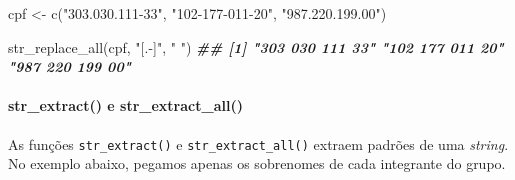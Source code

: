 \documentclass[
]{book}
\newenvironment{Shaded}{\begin{snugshade}}{\end{snugshade}}
\newcommand{\DocumentationTok}[1]{\textcolor[rgb]{0.56,0.35,0.01}{\textbf{\textit{#1}}}}
\newcommand{\FunctionTok}[1]{\textcolor[rgb]{0.00,0.00,0.00}{#1}}
\newcommand{\NormalTok}[1]{#1}
\newcommand{\OtherTok}[1]{\textcolor[rgb]{0.56,0.35,0.01}{#1}}
\newcommand{\StringTok}[1]{\textcolor[rgb]{0.31,0.60,0.02}{#1}}
\begin{document}
\begin{Shaded}
\begin{Highlighting}[]
\NormalTok{cpf }\OtherTok{\textless{}{-}} \FunctionTok{c}\NormalTok{(}\StringTok{"303.030.111{-}33"}\NormalTok{, }\StringTok{"102{-}177{-}011{-}20"}\NormalTok{, }\StringTok{"987.220.199.00"}\NormalTok{)}

\FunctionTok{str\_replace\_all}\NormalTok{(cpf, }\StringTok{"[.{-}]"}\NormalTok{, }\StringTok{" "}\NormalTok{)}
\DocumentationTok{\#\# [1] "303 030 111 33" "102 177 011 20" "987 220 199 00"}
\end{Highlighting}
\end{Shaded}

\hypertarget{str_extract-e-str_extract_all}{%
\paragraph*{str\_extract() e str\_extract\_all()}\label{str_extract-e-str_extract_all}}

As funções \texttt{str\_extract()} e \texttt{str\_extract\_all()} extraem padrões de uma \emph{string}. No exemplo abaixo, pegamos apenas os sobrenomes de cada integrante do grupo.

\begin{Shaded}
\end{Shaded}
\end{document}
